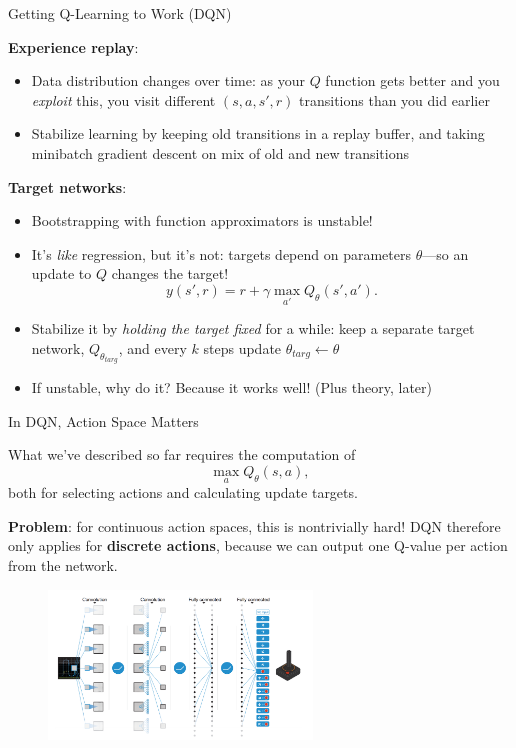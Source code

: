 \documentclass[9pt]{beamer}
\begin{document}
\begin{frame}{Getting Q-Learning to Work (DQN)}

\textbf{Experience replay}:
\begin{itemize}
\item Data distribution changes over time: as your $Q$ function gets better and you \textit{exploit} this, you visit different $(s,a,s',r)$ transitions than you did earlier
\item Stabilize learning by keeping old transitions in a replay buffer, and taking minibatch gradient descent on mix of old and new transitions
\end{itemize}
\pause
\textbf{Target networks}:
\begin{itemize}
\item Bootstrapping with function approximators is unstable! 
\item It's \textit{like} regression, but it's not: targets depend on parameters $\theta$---so an update to $Q$ changes the target!
%
\begin{equation*}
y(s',r) = r + \gamma \max_{a'} Q_{\theta}(s',a').
\end{equation*}
%
\item Stabilize it by \textit{holding the target fixed} for a while: keep a separate target network, $Q_{\theta_{targ}}$, and every $k$ steps update $\theta_{targ} \leftarrow \theta$
\item If unstable, why do it? Because it works well! (Plus theory, later)
\end{itemize}

\end{frame}

\begin{frame}{In DQN, Action Space Matters}

What we've described so far requires the computation of
%
\begin{equation*}
\max_{a} Q_{\theta}(s,a),
\end{equation*}
%
both for selecting actions and calculating update targets.

\vspace{1em}
\textbf{Problem}: for continuous action spaces, this is nontrivially hard! DQN therefore only applies for \textbf{discrete actions}, because we can output one Q-value per action from the network.

\begin{figure}
\centering
\includegraphics[width=7cm]{dqn-nature}
\end{figure}

\end{frame}
\end{document}
